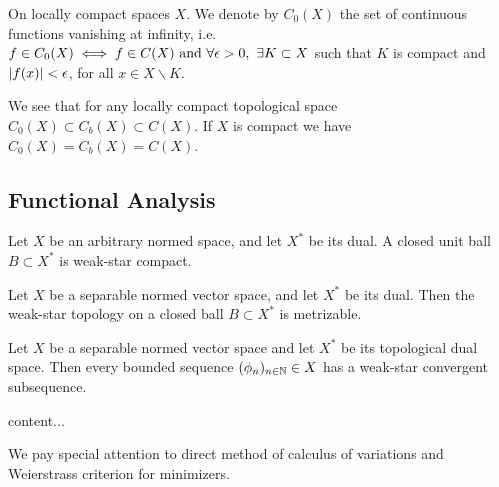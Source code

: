 On locally compact spaces $X$. We denote by $C_0(X)$ the set of continuous functions vanishing at infinity, i.e. $f\in C_0(X) \iff f \in C(X)\ \mathrm{and} \ \forall \epsilon >0,\ \exists K\subset X$ such that $K$ is compact and $\left| f(x) \right|<\epsilon$, for all $x\in X\backslash K$. 

We see that for any locally compact topological space $C_0(X)\subset C_b(X)\subset C(X)$. If $X$ is compact we have $C_0(X)=C_b(X)=C(X)$.





\subsection{Functional Analysis}
\begin{definition}
\end{definition}
\begin{theorem}
\end{theorem}
\begin{definition}
\end{definition}
\begin{definition}	
\end{definition}
\begin{definition}
\end{definition}
\begin{definition}[Duality]
\end{definition}
\begin{theorem}
Let $X$ be an arbitrary normed space, and let $X^*$ be its dual. A closed unit ball $B\subset X^*$ is weak-star compact.
\end{theorem}
\begin{theorem}
Let $X$ be a separable normed vector space, and let $X^*$ be its dual. Then the weak-star topology on a closed ball $B\subset X^*$ is metrizable. 
\end{theorem}
\begin{corollary} Let $X$ be a separable normed vector space and let $X^*$ be its topological dual space. Then every bounded sequence $(\phi_n)_{n\in \mathbb{N}}\in X$ has a weak-star convergent subsequence.
\end{corollary}
\begin{theorem}
	content...
\end{theorem}
We pay special attention to direct method of calculus of variations and Weierstrass criterion for minimizers.
\begin{theorem}
\end{theorem}
